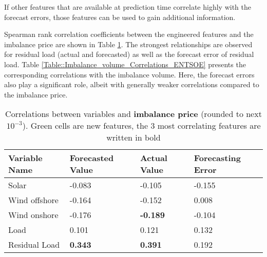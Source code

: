 \documentclass[class=scrbook, crop=false]{standalone}
\begin{document}
If other features that are available at prediction time correlate highly with the forecast errors, those features can be used to gain additional information.

Spearman rank correlation coefficients between the engineered features and the imbalance price are shown in Table \ref{Table::Rebap_Correlations_ENTSOE}. The strongest relationships are observed for residual load (actual and forecasted) as well as the forecast error of residual load.
Table \ref{Table::Imbalance_volume_Correlations_ENTSOE} presents the corresponding correlations with the imbalance volume. Here, the forecast errors also play a significant role, albeit with generally weaker correlations compared to the imbalance price.



    
    

    \begin{table}
    \centering
    \begin{tabular}{l|l|l|l}
    Variable Name	&Forecasted Value& Actual Value	& Forecasting Error \\\hline
    Solar 		& -0.083		& -0.105		& \cellcolor{green} -0.155 \\
    Wind offshore 	& -0.164		& -0.152		& \cellcolor{green} 0.008 \\
    Wind onshore 	& -0.176		& \textbf{-0.189}	& \cellcolor{green} -0.104 \\
    Load 		&0.101		& 0.121		& \cellcolor{green}  0.132 \\
    Residual Load 	& \cellcolor{green} \textbf{0.343}& \cellcolor{green} \textbf{0.391}& \cellcolor{green}0.192\\
    \end{tabular}

    
    \caption{Correlations between variables and \textbf{imbalance price} (rounded to next $10^{-3}$). Green cells are new features, the 3 most correlating features are written in bold}
    \label{Table::Rebap_Correlations_ENTSOE}
    \end{table}
\end{document}
